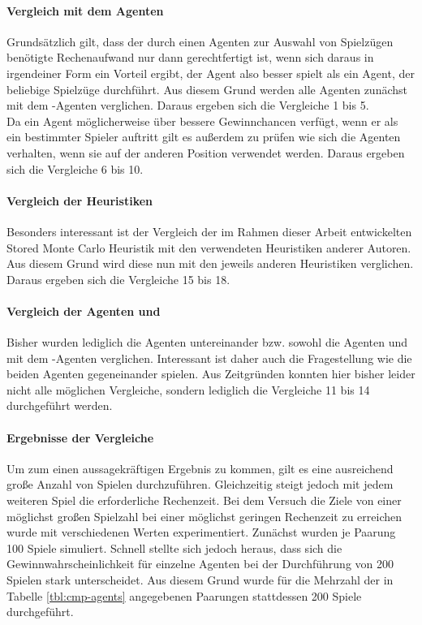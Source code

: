 \paragraph{Vergleich mit dem Agenten }
Grundsätzlich gilt, dass der durch einen Agenten zur Auswahl von Spielzügen benötigte Rechenaufwand nur dann gerechtfertigt ist, wenn sich daraus in irgendeiner Form ein Vorteil ergibt, der Agent also besser spielt als ein Agent, der beliebige Spielzüge durchführt. Aus diesem Grund werden alle Agenten zunächst mit dem -Agenten verglichen. Daraus ergeben sich die Vergleiche 1 bis 5.
\\Da ein Agent möglicherweise über bessere Gewinnchancen verfügt, wenn er als ein bestimmter Spieler auftritt gilt es außerdem zu prüfen wie sich die Agenten verhalten, wenn sie auf der anderen Position verwendet werden. Daraus ergeben sich die Vergleiche 6 bis 10.

\paragraph{Vergleich der Heuristiken}
Besonders interessant ist der Vergleich der im Rahmen dieser Arbeit entwickelten Stored Monte Carlo Heuristik mit den verwendeten Heuristiken anderer Autoren. Aus diesem Grund wird diese nun mit den jeweils anderen Heuristiken verglichen. Daraus ergeben sich die Vergleiche 15 bis 18.

\paragraph{Vergleich der Agenten \mxZitat{\abp} und }
Bisher wurden lediglich die Agenten \mxZitat{\abp} untereinander bzw. sowohl die Agenten \mxZitat{\abp} und  mit dem -Agenten verglichen. Interessant ist daher auch die Fragestellung wie die beiden Agenten gegeneinander spielen. Aus Zeitgründen konnten hier bisher leider nicht alle möglichen Vergleiche, sondern lediglich die Vergleiche 11 bis 14 durchgeführt werden.

\paragraph{Ergebnisse der Vergleiche}
\label{p:vgl-result}
Um zum einen aussagekräftigen Ergebnis zu kommen, gilt es eine ausreichend große Anzahl von Spielen durchzuführen. Gleichzeitig steigt jedoch mit jedem weiteren Spiel die erforderliche Rechenzeit. Bei dem Versuch die Ziele von einer möglichst großen Spielzahl bei einer möglichst geringen Rechenzeit zu erreichen wurde mit verschiedenen Werten experimentiert. Zunächst wurden je Paarung 100 Spiele simuliert. Schnell stellte sich jedoch heraus, dass sich die Gewinnwahrscheinlichkeit für einzelne Agenten bei der Durchführung von 200 Spielen stark unterscheidet. Aus diesem Grund wurde für die Mehrzahl der in Tabelle \ref{tbl:cmp-agents} angegebenen Paarungen stattdessen 200 Spiele durchgeführt.

